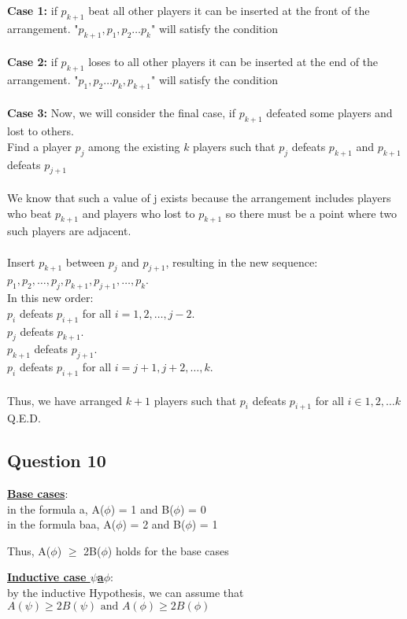 \documentclass[11pt]{article}
\begin{document}
{{{\noindent
\textbf{Case 1:}
if $p_{k+1}$ beat all other players it can be inserted at the front of the arrangement.
"$p_{k+1}, p_1, p_2 \ldots p_{k}$" will satisfy the condition \\
\\
\textbf{Case 2:}
if $p_{k+1}$ loses to all other players it can be inserted at the end of the arrangement.
"$p_1, p_2 \ldots p_{k}, p_{k+1}$" will satisfy the condition\\
\\
\textbf{Case 3:}
Now, we will consider the final case, if $p_{k+1}$ defeated some players and lost to others.\\
Find a player $p_j$ among the existing $k$ players such that
$p_{j}$ defeats $p_{k+1}$ and $p_{k+1}$ defeats $p_{j+1}$ \\
\\
We know that such a value of j exists because the arrangement includes
players who beat $p_{k+1}$ and players who lost to $p_{k+1}$
so there must be a point where two such players are adjacent. \\
\\
Insert $p_{k+1}$ between $p_j$ and $p_{j+1}$, resulting in the new sequence:\\
$p_1, p_2, \ldots, p_j, p_{k+1}, p_{j+1}, \ldots, p_k$.\\
In this new order:\\
$p_i$ defeats $p_{i+1}$ for all $i = 1, 2, \ldots, j-2$.\\
$p_j$ defeats $p_{k+1}$.\\
$p_{k+1}$ defeats $p_{j+1}$.\\
$p_i$ defeats $p_{i+1}$ for all $i = j+1, j+2, \ldots, k$.\\
\\
Thus, we have arranged $k+1$ players such that $p_i$ defeats $p_{i+1}$
for all $i \in 1, 2, \ldots k$\\
Q.E.D.

\subsection*{Question 10}
\underline{\textbf{Base cases}}: \\
in the formula a,
A($\phi$) = 1 and B($\phi$) = 0 \\
in the formula baa,
A($\phi$) = 2 and B($\phi$) = 1

Thus, A($\phi$) $\geq$ 2B($\phi$) holds for the base cases

\noindent
\underline{\textbf{Inductive case $\psi$a$\phi$}}: \\
by the inductive Hypothesis, we can assume that
$A(\psi) \geq 2B(\psi) \text{ and } A(\phi) \geq 2B(\phi)$

}}}
\end{document}
